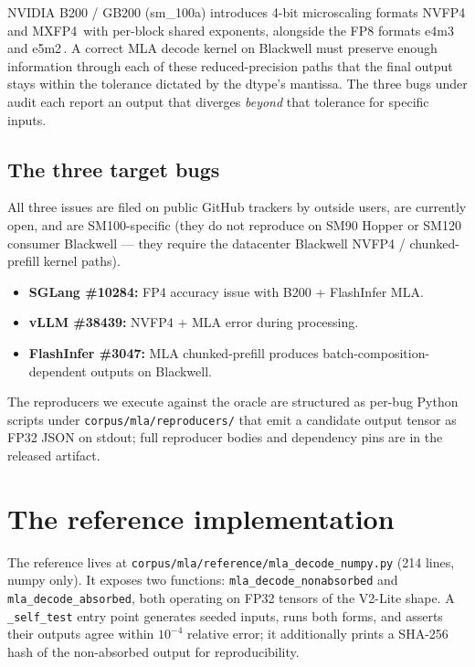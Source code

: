 \documentclass[11pt]{article}
\begin{document}
NVIDIA B200 / GB200 (sm\_100a) introduces 4-bit microscaling formats
NVFP4 and MXFP4\,\citep{nvfp4-blog} with per-block shared exponents,
alongside the FP8 formats e4m3 and e5m2\,\citep{fp8-formats}. A correct
MLA decode kernel on Blackwell must preserve enough information through
each of these reduced-precision paths that the final output stays within
the tolerance dictated by the dtype's mantissa. The three bugs under
audit each report an output that diverges \emph{beyond} that tolerance
for specific inputs.

\subsection{The three target bugs}
\label{sec:background-bugs}

All three issues are filed on public GitHub trackers by outside users,
are currently open, and are SM100-specific (they do not reproduce on
SM90 Hopper or SM120 consumer Blackwell --- they require the datacenter
Blackwell NVFP4 / chunked-prefill kernel paths).

\begin{itemize}
\item \textbf{SGLang \#10284:} FP4 accuracy issue with B200 + FlashInfer MLA.
\item \textbf{vLLM \#38439:} NVFP4 + MLA error during processing.
\item \textbf{FlashInfer \#3047:} MLA chunked-prefill produces
      batch-composition-dependent outputs on Blackwell.
\end{itemize}

The reproducers we execute against the oracle are structured as
per-bug Python scripts under \texttt{corpus/mla/reproducers/} that
emit a candidate output tensor as FP32 JSON on stdout; full reproducer
bodies and dependency pins are in the released artifact.

\section{The reference implementation}
\label{sec:reference}

The reference lives at \texttt{corpus/mla/reference/mla\_decode\_numpy.py}
(214 lines, numpy only). It exposes two functions:
\texttt{mla\_decode\_nonabsorbed} and \texttt{mla\_decode\_absorbed},
both operating on FP32 tensors of the V2-Lite shape. A \texttt{\_self\_test}
entry point generates seeded inputs, runs both forms, and asserts their
outputs agree within \(10^{-4}\) relative error; it additionally prints
a SHA-256 hash of the non-absorbed output for reproducibility.
\end{document}
